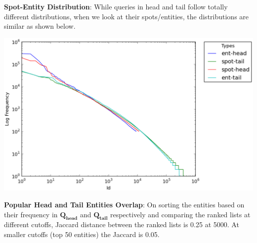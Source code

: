 \documentclass[a0,portrait,final]{a0poster}
\newcommand{\tail}[1]{$\mathbf{Q_{tail}}${}}
\newcommand{\head}[1]{$\mathbf{Q_{head}}${}}
\begin{document}
\begin{multicols}{2}
\vspace{1cm}

\textbf{Spot-Entity Distribution}: While queries in head and tail follow totally different distributions, when we 		look at their spots/entities, the distributions are similar as shown below.
		\vspace{10mm}
		\begin{center}
		\includegraphics[width=0.9\columnwidth]{img/head-tail-ent-spot-dist.eps}
		\label{img:distributions}
		\end{center}

\textbf{Popular Head and Tail Entities Overlap}: On sorting the entities based on their frequency in \head{} 		and \tail{} respectively and comparing the ranked lists at different cutoffs, Jaccard distance between the ranked lists is 		0.25 at 5000. At smaller cutoffs (top 50 entities) the Jaccard is 0.05. 



\end{multicols}
\end{document}
